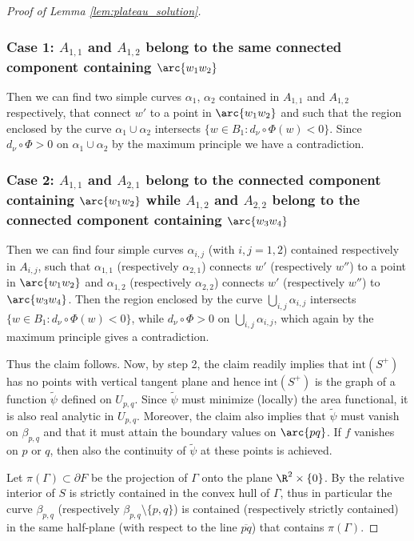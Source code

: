 \begin{proof}[Proof of Lemma \ref{lem:plateau_solution}]
\subsubsection*{Case 1: $A_{1,1}$ and $A_{1,2}$ belong to the same connected component containing $\arc{w_1w_2}$}
Then we can find two simple curves $\alpha_1$, $\alpha_2$ contained in $A_{1,1}$ and $A_{1,2}$ respectively, that connect $w'$ to a point in $\arc{w_1w_2}$ and such that the region enclosed by the curve $\alpha_1\cup\alpha_2$ intersects $\{w\in B_1\colon d_\nu\circ\Phi(w)<0\}$. Since $d_\nu\circ \Phi>0$ on $\alpha_1\cup\alpha_2$ by the maximum principle we have a contradiction.

\subsubsection*{Case 2: $A_{1,1}$ and $A_{2,1}$ belong to the connected component containing $\arc{w_1w_2}$ while $A_{1,2}$ and $A_{2,2}$ belong to the connected component containing $\arc{w_3w_4}$}
Then we can find four simple curves $\alpha_{i,j}$ (with $i,j=1,2$) contained respectively in $A_{i,j}$, such that $\alpha_{1,1}$ (respectively $\alpha_{2,1}$) connects $w'$ (respectively $w''$) to a point in $\arc{w_1w_2}$ and $\alpha_{1,2}$ (respectively $\alpha_{2,2}$) connects $w'$ (respectively $w''$) to $\arc{w_3w_4}$. Then the region enclosed by the curve $\bigcup_{i,j}\alpha_{i,j}$ intersects $\{w\in B_1\colon d_\nu\circ\Phi(w)<0\}$, while $d_\nu\circ\Phi>0$ on $\bigcup_{i,j}\alpha_{i,j}$, which again by the maximum principle gives a contradiction.

\smallskip
Thus the claim follows. { Now, by step 2, the claim readily implies that $\mathrm{int}(S^+)$ has no points with vertical tangent plane and hence $\mathrm{int}(S^+)$ is the graph of a function $\widetilde\psi$ defined on ${U_{p,q}}$. Since $\widetilde \psi$ must minimize (locally) the area functional, it is also real analytic in $U_{p,q}$. Moreover, the claim also implies that $\widetilde\psi$ must vanish on $\beta_{p,q}$ and that it must attain the boundary values on $\arc{pq}$. If $f$ vanishes on $p$ or $q$, then also the continuity of $\widetilde\psi$ at these points is achieved. }

Let $\pi(\Gamma)\subset\partial F$ be the projection of $\Gamma$ onto the plane $\R^2\times\{0\}$. By \cite[Th.\,3, p.\,343]{DHS} the relative interior of $S$ is strictly contained in the convex hull of $\Gamma$, thus in particular
the curve $\beta_{p,q}$ (respectively $\beta_{p,q}\setminus\{p,q\}$) is contained (respectively strictly contained) in the same half-plane (with respect to the line $\overline{pq}$) that contains $\pi(\Gamma)$.


\end{proof}
